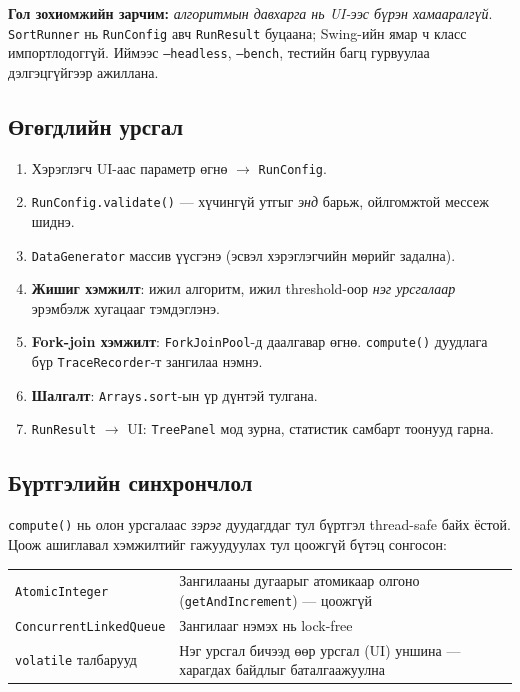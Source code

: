 \documentclass[11pt,a4paper]{article}
\begin{document}
\textbf{Гол зохиомжийн зарчим:} \emph{алгоритмын давхарга нь UI-ээс бүрэн
хамааралгүй}. \texttt{SortRunner} нь \texttt{RunConfig} авч \texttt{RunResult}
буцаана; Swing-ийн ямар ч класс импортлодоггүй. Иймээс \texttt{--headless},
\texttt{--bench}, тестийн багц гурвуулаа дэлгэцгүйгээр ажиллана.

\subsection{Өгөгдлийн урсгал}
\begin{enumerate}[nosep,leftmargin=*]
  \item Хэрэглэгч UI-аас параметр өгнө $\to$ \texttt{RunConfig}.
  \item \texttt{RunConfig.validate()} --- хүчингүй утгыг \emph{энд} барьж,
        ойлгомжтой мессеж шиднэ.
  \item \texttt{DataGenerator} массив үүсгэнэ (эсвэл хэрэглэгчийн мөрийг задална).
  \item \textbf{Жишиг хэмжилт}: ижил алгоритм, ижил threshold-оор
        \emph{нэг урсгалаар} эрэмбэлж хугацааг тэмдэглэнэ.
  \item \textbf{Fork-join хэмжилт}: \texttt{ForkJoinPool}-д даалгавар өгнө.
        \texttt{compute()} дуудлага бүр \texttt{TraceRecorder}-т зангилаа нэмнэ.
  \item \textbf{Шалгалт}: \texttt{Arrays.sort}-ын үр дүнтэй тулгана.
  \item \texttt{RunResult} $\to$ UI: \texttt{TreePanel} мод зурна, статистик
        самбарт тоонууд гарна.
\end{enumerate}

\subsection{Бүртгэлийн синхрончлол}
\texttt{compute()} нь олон урсгалаас \emph{зэрэг} дуудагддаг тул бүртгэл
thread-safe байх ёстой. Цоож ашиглавал хэмжилтийг гажуудуулах тул цоожгүй
бүтэц сонгосон:
\begin{center}
\small
\begin{tabular}{lL{10.0cm}}
\toprule
\texttt{AtomicInteger} & Зангилааны дугаарыг атомикаар олгоно
(\texttt{getAndIncrement}) --- цоожгүй \\
\texttt{ConcurrentLinkedQueue} & Зангилааг нэмэх нь lock-free \\
\texttt{volatile} талбарууд & Нэг урсгал бичээд өөр урсгал (UI) уншина ---
харагдах байдлыг баталгаажуулна \\
\bottomrule
\end{tabular}
\end{center}
\end{document}
